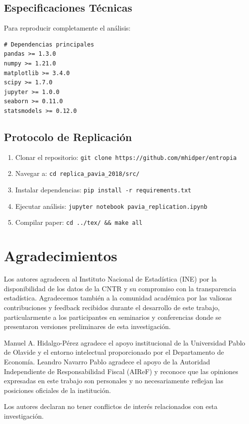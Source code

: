 \documentclass[12pt,a4paper]{article}
\begin{document}
\subsection{Especificaciones Técnicas}

Para reproducir completamente el análisis:

\begin{verbatim}
# Dependencias principales
pandas >= 1.3.0
numpy >= 1.21.0
matplotlib >= 3.4.0
scipy >= 1.7.0
jupyter >= 1.0.0
seaborn >= 0.11.0
statsmodels >= 0.12.0
\end{verbatim}

\subsection{Protocolo de Replicación}

\begin{enumerate}
\item Clonar el repositorio: \texttt{git clone https://github.com/mhidper/entropia}
\item Navegar a: \texttt{cd replica\_pavia\_2018/src/}
\item Instalar dependencias: \texttt{pip install -r requirements.txt}
\item Ejecutar análisis: \texttt{jupyter notebook pavia\_replication.ipynb}
\item Compilar paper: \texttt{cd ../tex/ \&\& make all}
\end{enumerate}

\section*{Agradecimientos}

Los autores agradecen al Instituto Nacional de Estadística (INE) por la disponibilidad de los datos de la CNTR y su compromiso con la transparencia estadística. Agradecemos también a la comunidad académica por las valiosas contribuciones y feedback recibidos durante el desarrollo de este trabajo, particularmente a los participantes en seminarios y conferencias donde se presentaron versiones preliminares de esta investigación.

Manuel A. Hidalgo-Pérez agradece el apoyo institucional de la Universidad Pablo de Olavide y el entorno intelectual proporcionado por el Departamento de Economía. Leandro Navarro Pablo agradece el apoyo de la Autoridad Independiente de Responsabilidad Fiscal (AIReF) y reconoce que las opiniones expresadas en este trabajo son personales y no necesariamente reflejan las posiciones oficiales de la institución.

Los autores declaran no tener conflictos de interés relacionados con esta investigación.



\end{document}
